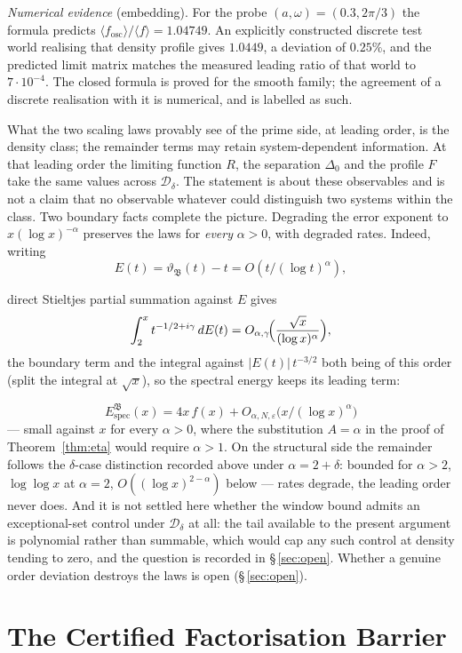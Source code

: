 \documentclass[11pt]{article}
\newcommand{\Dclass}{\mathcal{D}_\delta}        %
\begin{document}
\emph{Numerical evidence} (embedding). For the probe
$(a,\omega)=(0.3,2\pi/3)$ the formula predicts
$\langle f_{\mathrm{osc}}\rangle/\langle f\rangle=1.04749$. An explicitly
constructed discrete test world realising that density profile gives
$1.0449$, a deviation of $0.25\%$, and the predicted limit matrix matches the
measured leading ratio of that world to $7\cdot10^{-4}$. The closed formula is
proved for the smooth family; the agreement of a discrete realisation with it
is numerical, and is labelled as such.

What the two scaling laws provably see of the prime side, at leading
order, is the density class; the remainder terms may retain
system-dependent information. At that leading order the limiting function
$R$, the separation $\Delta_0$ and the profile $F$ take the same values
across $\Dclass$. The statement is about
these observables and is not a claim that no observable whatever could
distinguish two systems within the class. Two boundary facts complete the picture. Degrading the error exponent to
$x(\log x)^{-\alpha}$ preserves the laws for \emph{every} $\alpha>0$, with
degraded rates. Indeed, writing 
\[
E(t)=\vartheta_{\mathfrak{B}}(t)-t=O(t/(\log t)^{\alpha}),
\]

direct Stieltjes partial summation against $E$ gives
\[
\int_{2}^{x}t^{-1/2+i\gamma}\,dE(t)
=O_{\alpha,\gamma}\!\Bigl(\frac{\sqrt{x}}{(\log x)^{\alpha}}\Bigr),
\]
the boundary term and the integral against $|E(t)|\,t^{-3/2}$ both being of
this order (split the integral at $\sqrt{x}$), so the spectral energy keeps
its leading term:

\[
E^{\mathfrak{B}}_{\mathrm{spec}}(x)=4x\,f(x)+O_{\alpha,N,\varepsilon}\bigl(x/(\log
x)^{\alpha}\bigr)
\]
 --- small against $x$ for every $\alpha>0$, where the
substitution $A=\alpha$ in the proof of Theorem~\ref{thm:eta} would require
$\alpha>1$. On the structural side the remainder follows the
$\delta$-case distinction recorded above under $\alpha=2+\delta$: bounded
for $\alpha>2$, $\log\log x$ at $\alpha=2$, $O((\log x)^{2-\alpha})$
below --- rates degrade, the leading order never does. And it is not settled here whether the window bound admits an exceptional-set
control under $\Dclass$ at all: the tail available to the present argument is
polynomial rather than summable, which would cap any such control at density
tending to zero, and the question is recorded in \S\,\ref{sec:open}. Whether a genuine order deviation destroys the laws is open
(\S\,\ref{sec:open}).

\section{The Certified Factorisation Barrier}
\label{sec:barrier}
\end{document}
